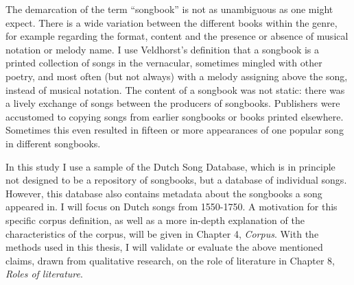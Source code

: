 The demarcation of the term \enquote{songbook} is not as unambiguous as one might expect. There is a wide variation between the different books within the genre, for example regarding the format, content and the presence or absence of musical notation or melody name. I use Veldhorst's definition that a songbook is a printed collection of songs in the vernacular, sometimes mingled with other poetry, and most often (but not always) with a melody assigning above the song, instead of musical notation. \autocite[15]{veldhorst_zingend_2009} The content of a songbook was not static: there was a lively exchange of songs between the producers of songbooks. Publishers were accustomed to copying songs from earlier songbooks or books printed elsewhere. Sometimes this even resulted in fifteen or more appearances of one popular song in different songbooks. \autocite[73-74]{veldhorst_zingend_2009}

In this study I use a sample of the Dutch Song Database, which is in principle not designed to be a repository of songbooks, but a database of individual songs. However, this database also contains metadata about the songbooks a song appeared in. I will focus on Dutch songs from 1550-1750. A motivation for this specific corpus definition, as well as a more in-depth explanation of the characteristics of the corpus, will be given in Chapter 4, \textit{Corpus}. With the methods used in this thesis, I will validate or evaluate the above mentioned claims, drawn from qualitative research, on the role of literature in Chapter 8, \textit{Roles of literature}.